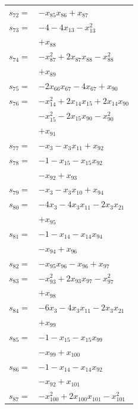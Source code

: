 \begin{longtable}{@{}r@{\;}l@{}}
\(s_{72}=\) & \(\displaystyle -x_{85}x_{86} +x_{87}\) \\[3pt]
\(s_{73}=\) & \(\displaystyle -4 -4x_{13} -x_{13}^{2}\) \\
 & \(\displaystyle +x_{88}\) \\[3pt]
\(s_{74}=\) & \(\displaystyle -x_{87}^{2} +2x_{87}x_{88} -x_{88}^{2}\) \\
 & \(\displaystyle +x_{89}\) \\[3pt]
\(s_{75}=\) & \(\displaystyle -2x_{66}x_{67} -4x_{67} +x_{90}\) \\[3pt]
\(s_{76}=\) & \(\displaystyle -x_{14}^{2} +2x_{14}x_{15} +2x_{14}x_{90}\) \\
 & \(\displaystyle -x_{15}^{2} -2x_{15}x_{90} -x_{90}^{2}\) \\
 & \(\displaystyle +x_{91}\) \\[3pt]
\(s_{77}=\) & \(\displaystyle -x_{3} -x_{3}x_{11} +x_{92}\) \\[3pt]
\(s_{78}=\) & \(\displaystyle -1 -x_{15} -x_{15}x_{92}\) \\
 & \(\displaystyle -x_{92} +x_{93}\) \\[3pt]
\(s_{79}=\) & \(\displaystyle -x_{3} -x_{3}x_{10} +x_{94}\) \\[3pt]
\(s_{80}=\) & \(\displaystyle -4x_{3} -4x_{3}x_{11} -2x_{3}x_{21}\) \\
 & \(\displaystyle +x_{95}\) \\[3pt]
\(s_{81}=\) & \(\displaystyle -1 -x_{14} -x_{14}x_{94}\) \\
 & \(\displaystyle -x_{94} +x_{96}\) \\[3pt]
\(s_{82}=\) & \(\displaystyle -x_{95}x_{96} -x_{96} +x_{97}\) \\[3pt]
\(s_{83}=\) & \(\displaystyle -x_{93}^{2} +2x_{93}x_{97} -x_{97}^{2}\) \\
 & \(\displaystyle +x_{98}\) \\[3pt]
\(s_{84}=\) & \(\displaystyle -6x_{3} -4x_{3}x_{11} -2x_{3}x_{21}\) \\
 & \(\displaystyle +x_{99}\) \\[3pt]
\(s_{85}=\) & \(\displaystyle -1 -x_{15} -x_{15}x_{99}\) \\
 & \(\displaystyle -x_{99} +x_{100}\) \\[3pt]
\(s_{86}=\) & \(\displaystyle -1 -x_{14} -x_{14}x_{92}\) \\
 & \(\displaystyle -x_{92} +x_{101}\) \\[3pt]
\(s_{87}=\) & \(\displaystyle -x_{100}^{2} +2x_{100}x_{101} -x_{101}^{2}\) \\

\end{longtable}
